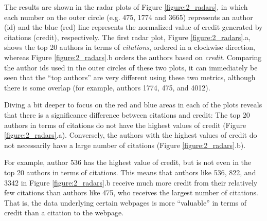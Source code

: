 \documentclass[preprint,12pt,sort&compress]{elsarticle}
\newcommand{\eat}[1]{}
\newcommand{\scream}[1]{{\bf * #1 *}{\typeout{#1}}}
\begin{document}
The results are shown in the radar plots of Figure \ref{figure:2_radars}, in which each number on the outer circle (e.g. 475, 1774 and 3665) represents an author (id) and the blue (red) line represents the normalized value of credit generated by citations (credit), respectively. The first radar plot,
Figure \ref{figure:2_radars}.a, shows the top 20 authors in terms of {\em citations}, ordered in a clockwise direction, whereas Figure \ref{figure:2_radars}.b orders the authors based on {\em credit}. 
Comparing the author ids used in the outer circles of these two plots, it can immediately be seen that the ``top authors'' are very different using these two metrics, although there is some overlap (for example, authors 1774, 475, and 4012). 

Diving a bit deeper to focus on the red and blue areas in each of the plots reveals that there is a significance difference between citations and credit:
The top 20 authors in terms of citations do not have the highest values of credit (Figure \ref{figure:2_radars}.a).  Conversely, the authors with the highest values of credit do not necessarily have a large number of citations (Figure \ref{figure:2_radars}.b).
\eat{This is due to the fact that certain citations are more ``valuable'' in terms of credit, i.e. an author receive more credit from his/her citations, even if fewer, than other authors. This, in turns, happens because certain citations generate more credit than others. 
So, for example, author 536 presents the highest value of credit, although he is not even in the top 20 authors in terms of citations. This means that he receives much more credit from his relatively few citations than author 475. }
For example, author 536 has the highest value of credit, but is not even in the top 20 authors in terms of citations. This means that authors like 536, 822, and 3342 in Figure \ref{figure:2_radars}.b receive much more credit from their relatively few citations than authors like 475, who receives the largest number of citations.
That is, the data underlying certain webpages is more ``valuable'' in terms of credit than a citation to the webpage.  

\eat{Given how we prepared our experiments, the citations whose query produce more tuples, are also the ones that generate more credit, since we assumed that each output tuple carries credit $1$. Thus, the authors of the data returned by these queries are the ones that will receive more credit from these citations. Also, the authors that collaborated with fewer people will also receive a biggest share from the equal subdivision of credit. }
\end{document}

